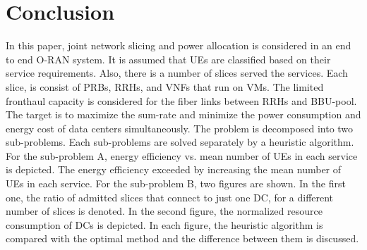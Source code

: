 \documentclass[conference]{IEEEtran}
\begin{document}
\section{Conclusion}
In this paper, joint network slicing and power allocation is considered in an end to end O-RAN system.
It is assumed that UEs are classified based on their service requirements. Also, there is a number of slices served the services. Each slice, is consist of PRBs, RRHs, and VNFs that run on VMs. The limited fronthaul capacity is considered for the fiber links between RRHs and BBU-pool.
The target is to maximize the sum-rate and minimize the power consumption and energy cost of data centers simultaneously.
The problem is decomposed into two sub-problems. Each sub-problems are solved separately by a heuristic algorithm. For the sub-problem A, energy efficiency vs. mean number of UEs in each service is depicted. The energy efficiency  exceeded by increasing the mean number of UEs in each service. For the sub-problem B, two figures are shown. In the first one, the ratio of admitted slices that connect to just one DC, for a different number of slices is denoted. In the second figure, the normalized resource consumption of DCs is depicted. In each figure, the heuristic algorithm is compared with the optimal method and the difference between them is discussed.

 


\end{document}
